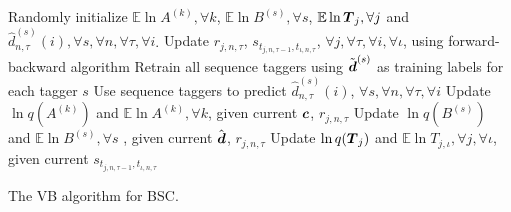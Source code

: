 \begin{algorithm}
\DontPrintSemicolon
 \nl Randomly initialize $\mathbb{E}\ln A^{(k)},\forall k$,
 $\mathbb{E}\ln B^{(s)},\forall s$, $\mathbb{E}\ln \boldsymbol T_j,\forall j$ 
 and $\hat{d}^{(s)}_{n,\tau}(i), \forall s,\forall n,\forall \tau,\forall i$.\;
 {
 \nl Update $r_{j,n,\tau}$, $s_{t_{j,n,\tau\!-\!1}, t_{\iota,n,\tau}}$, $\forall j,\forall \tau,\forall i,\forall \iota$,
 using forward-backward algorithm\;%
 \nl Retrain all sequence taggers using $\tilde{\boldsymbol d}^{(s)}$ as training labels for 
 each tagger $s$\;
 \nl Use sequence taggers to predict $\hat{d}^{(s)}_{n,\tau}(i)$, $\forall s,\forall n,\forall \tau,\forall i$\;
 \nl Update $\ln q(A^{(k)})$ and $\mathbb{E}\ln A^{(k)},\forall k$, 
 given current $\boldsymbol c$, $r_{j,n,\tau}$\;
 \nl Update $\ln q(B^{(s)})$ and $\mathbb{E}\ln B^{(s)},\forall s$ ,
 given current $\hat{\boldsymbol d}$, $r_{j,n,\tau}$\;
 \nl Update $\ln q(\boldsymbol T_j)$ and $\mathbb{E}\ln T_{j,\iota},\forall j,\forall \iota$, 
 given current $s_{t_{j,n,\tau\!-\!1}, t_{\iota,n,\tau}}$\;
 }
\;
\caption{The VB algorithm for BSC.}
\label{al:vb_bac}
\end{algorithm}

